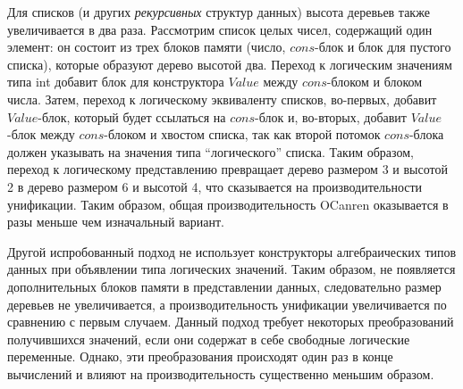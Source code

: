 \documentclass[10pt]{article}
\begin{document}
Для списков (и других \emph{рекурсивных} структур данных) высота деревьев также увеличивается в два раза. Рассмотрим
список целых чисел, содержащий один элемент: он состоит из трех блоков памяти (число, $cons$-блок и блок для пустого списка),
которые образуют дерево высотой два. Переход к логическим значениям типа int добавит блок для конструктора $Value$
между $cons$-блоком и блоком числа. Затем, переход к логическому эквиваленту списков, во-первых, добавит $Value$-блок, который будет
ссылаться на $cons$-блок и, во-вторых, добавит $Value$-блок между $cons$-блоком и хвостом списка, так как второй потомок
$cons$-блока должен указывать на значения типа ``логического'' списка. Таким образом, переход к логическому представлению
превращает дерево размером 3 и высотой 2 в дерево размером 6 и высотой 4, что сказывается на производительности унификации.
Таким образом, общая производительность OCanren оказывается в разы меньше чем изначальный вариант.

Другой испробованный подход не использует конструкторы алгебраических типов данных при объявлении типа логических значений.
Таким образом, не появляется дополнительных блоков памяти в представлении данных, следовательно размер деревьев не увеличивается,
а производительность унификации увеличивается по сравнению с первым случаем. Данный подход требует некоторых
преобразований получившихся значений, если они содержат в себе свободные логические переменные. Однако, эти преобразования
происходят один раз в конце вычислений и влияют на производительность существенно меньшим образом.


\end{document}
